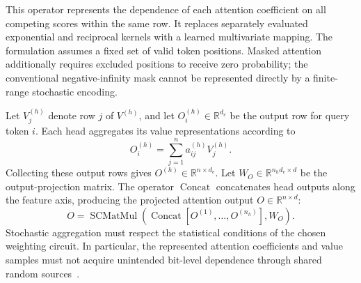 \documentclass[pdflatex,sn-mathphys-num]{sn-jnl}
\theoremstyle{thmstyleone}
\theoremstyle{thmstyletwo}
\theoremstyle{thmstylethree}
\begin{document}
This operator represents the dependence of each attention coefficient on all competing scores within the same row. It replaces separately evaluated exponential and reciprocal kernels with a learned multivariate mapping. The formulation assumes a fixed set of valid token positions. Masked attention additionally requires excluded positions to receive zero probability; the conventional negative-infinity mask cannot be represented directly by a finite-range stochastic encoding.

Let $V_j^{(h)}$ denote row $j$ of $V^{(h)}$, and let $O_i^{(h)}\in\mathbb{R}^{d_v}$ be the output row for query token $i$. Each head aggregates its value representations according to
\begin{equation}
O_i^{(h)} = \sum_{j=1}^{n} a_{ij}^{(h)}V_j^{(h)}. \label{eq:stochastic_attention_aggregation}
\end{equation}
Collecting these output rows gives $O^{(h)}\in\mathbb{R}^{n\times d_v}$. Let $W_O\in\mathbb{R}^{n_h d_v\times d}$ be the output-projection matrix. The operator $\operatorname{Concat}$ concatenates head outputs along the feature axis, producing the projected attention output $O\in\mathbb{R}^{n\times d}$:
\begin{equation}
O = \operatorname{SCMatMul} \left( \operatorname{Concat} \left[ O^{(1)},\ldots,O^{(n_h)} \right], W_O \right).
\end{equation}
Stochastic aggregation must respect the statistical conditions of the chosen weighting circuit. In particular, the represented attention coefficients and value samples must not acquire unintended bit-level dependence through shared random sources~\cite{alaghi2013correlation}.
\end{document}
